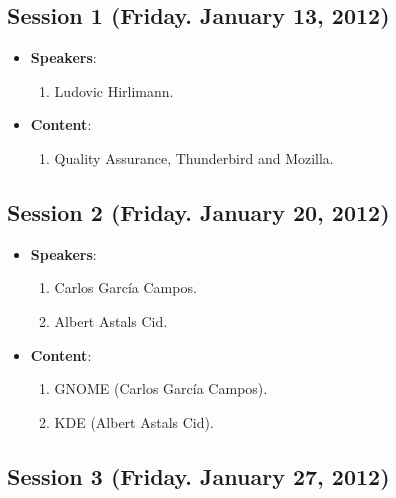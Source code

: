 \documentclass[a4paper]{article}
\begin{document}
\subsection{Session 1 (Friday. January 13, 2012)}

\begin{itemize}
 \item \textbf{Speakers}:

  \begin{enumerate}
   \item Ludovic Hirlimann.
  \end{enumerate}

 \item \textbf{Content}:

  \begin{enumerate}
   \item Quality Assurance, Thunderbird and Mozilla.
  \end{enumerate}

\end{itemize}

\subsection{Session 2 (Friday. January 20, 2012)}

\begin{itemize}
 \item \textbf{Speakers}: 

  \begin{enumerate}
   \item Carlos García Campos.
   \item Albert Astals Cid.
  \end{enumerate}

 \item \textbf{Content}:

  \begin{enumerate}
   \item GNOME (Carlos García Campos).
   \item KDE (Albert Astals Cid).
  \end{enumerate}

\end{itemize}

\subsection{Session 3 (Friday. January 27, 2012)}
\end{document}
